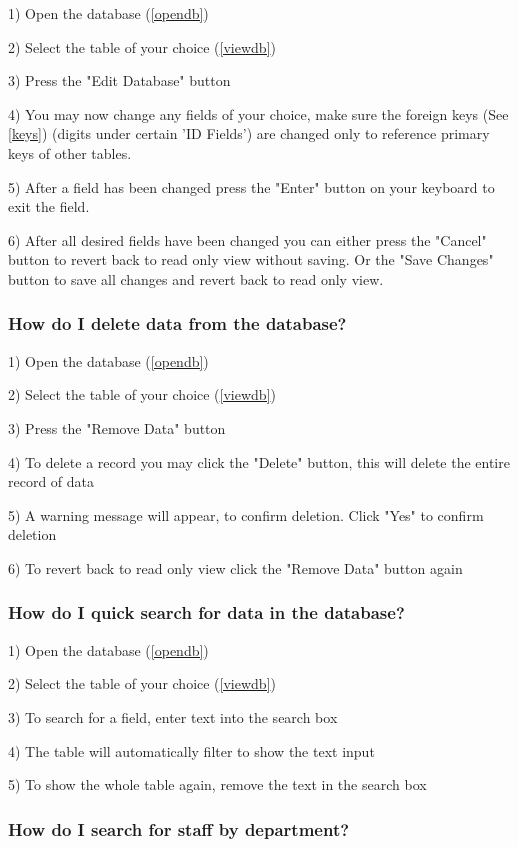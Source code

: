 1) Open the database (\ref{opendb})

2) Select the table of your choice (\ref{viewdb})

3) Press the "Edit Database" button 

4) You may now change any fields of your choice, make sure the foreign keys (See \ref{keys}) (digits under certain 'ID Fields') are changed only to reference primary keys of other tables.

5) After a field has been changed press the "Enter" button on your keyboard to exit the field.

6) After all desired fields have been changed you can either press the "Cancel" button to revert back to read only view without saving. Or the "Save Changes" button to save all changes and revert back to read only view.

\subsubsection{How do I delete data from the database?}

1) Open the database (\ref{opendb})

2) Select the table of your choice (\ref{viewdb})

3) Press the "Remove Data" button

4) To delete a record you may click the "Delete" button, this will delete the entire record of data

5) A warning message will appear, to confirm deletion. Click "Yes" to confirm deletion

6) To revert back to read only view click the "Remove Data" button again

\subsubsection{How do I quick search for data in the database?}

1) Open the database (\ref{opendb})

2) Select the table of your choice (\ref{viewdb})

3) To search for a field, enter text into the search box 

4) The table will automatically filter to show the text input

5) To show the whole table again, remove the text in the search box

\subsubsection{How do I search for staff by department?}


